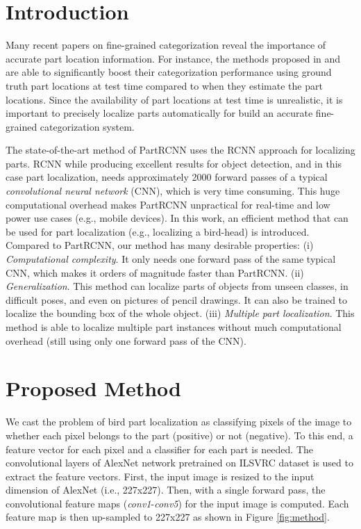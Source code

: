 \documentclass[10pt,twocolumn,letterpaper]{article}
\begin{document}
\section{Introduction}

Many recent papers on fine-grained categorization reveal the importance of accurate part location information. For instance, the methods proposed in \cite{poof} and \cite{partrcnn} are able to significantly boost their categorization performance using ground truth part locations at test time compared to when they estimate the part locations. Since the availability of part locations at test time is unrealistic, it is important to precisely localize parts automatically for build an accurate fine-grained categorization system.

The state-of-the-art method of PartRCNN \cite{partrcnn} uses the RCNN \cite{rcnn} approach for localizing parts. 
RCNN while producing excellent results for object detection, and in this case part localization, needs approximately 2000 forward passes of a typical {\it convolutional neural network} (CNN), which is very time consuming. This huge computational overhead makes PartRCNN unpractical for real-time and low power use cases (e.g., mobile devices). In this work, an efficient method that can be used for part localization (e.g., localizing a bird-head) is introduced. Compared to PartRCNN, our method has many desirable properties: (i) \textit{Computational complexity}. It only needs one forward pass of the same typical CNN, which makes it orders of magnitude faster than PartRCNN. (ii) \textit{Generalization}. This method can localize parts of objects from unseen classes, in difficult poses, and even on pictures of pencil drawings. It can also be trained to localize the bounding box of the whole object. (iii) \textit{Multiple part localization}. This method is able  to localize multiple part instances without much computational overhead (still using only one forward pass of the CNN).

\section{Proposed Method}
We cast the problem of bird part localization as classifying pixels of the image to whether each pixel belongs to the part (positive) or not (negative). To this end, a feature vector for each pixel and a classifier for each part is needed. The convolutional layers of AlexNet \cite{alexnet} network pretrained on ILSVRC dataset \cite{ilsvrc} is used to extract the feature vectors. First, the input image is resized to the input dimension of AlexNet (i.e., 227x227). Then, with a single forward pass, the convolutional feature maps (\textit{conv1}-\textit{conv5}) for the input image is computed. Each feature map is then up-sampled to 227x227 as shown in Figure \ref{fig:method}.
\end{document}
